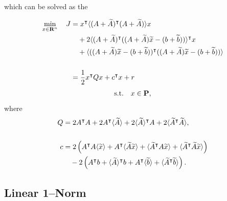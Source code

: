 \documentclass{article}
\begin{document}
    which can be solved as the \QP

    \begin{align*}
        \min_{x\in\textbf{R}^n}\quad J&=x^\intercal\langle(A+\widetilde{A})^\intercal  (A+\widetilde{A})\rangle x\\
        &\quad+
        2\langle(A+\widetilde{A})^\intercal  ((A+\widetilde{A})\widetilde{x}-(b+\widetilde{b}))\rangle^\intercal x\\
        &\quad+
        \langle((A+\widetilde{A})\widetilde{x}
        -(b+\widetilde{b}))^\intercal  ((A+\widetilde{A})\widetilde{x}
        -(b+\widetilde{b}))\rangle\\\\
        &=\frac{1}{2}x^\intercal Q x + c^\intercal x + r
    \end{align*}  
    \begin{align*}
        \text{s.t.}\quad x\in\textbf{P},
    \end{align*}  
    where    
    \begin{align*}
        Q   &=2A^\intercal  A + 2A^\intercal  \langle\widetilde{A}\rangle + 2\langle\widetilde{A}\rangle^\intercal  A + 2\langle\widetilde{A}^\intercal  \widetilde{A} \rangle,\\
        \\
        c&=
        2\left(A^\intercal A\langle\widetilde{x}\rangle
        +A^\intercal \langle\widetilde{A}\widetilde{x}\rangle
        +\langle\widetilde{A}^\intercal A\widetilde{x}\rangle
        +\langle\widetilde{A}^\intercal \widetilde{A}\widetilde{x}\rangle\right)\\
        &\quad
        -2\left(A^\intercal b
        +\langle\widetilde{A}\rangle^\intercal b
        +A^\intercal \langle\widetilde{b}\rangle
        +\langle\widetilde{A}^\intercal \widetilde{b}\rangle\right).
    \end{align*}

\subsection{Linear 1--Norm}
\end{document}
